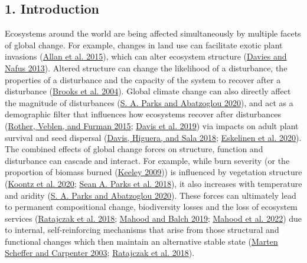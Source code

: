 \documentclass[
  12pt,
]{article}
\begin{document}
\hypertarget{introduction}{%
\subsection{1. Introduction}\label{introduction}}

Ecosystems around the world are being affected simultaneously by
multiple facets of global change. For example, changes in land use can
facilitate exotic plant invasions
(\protect\hyperlink{ref-Allan2015}{Allan et al. 2015}), which can alter
ecosystem structure (\protect\hyperlink{ref-Davies2013}{Davies and Nafus
2013}). Altered structure can change the likelihood of a disturbance,
the properties of a disturbance and the capacity of the system to
recover after a disturbance (\protect\hyperlink{ref-Brooks2004}{Brooks
et al. 2004}). Global climate change can also directly affect the
magnitude of disturbances (\protect\hyperlink{ref-Parks2020}{S. A. Parks
and Abatzoglou 2020}), and act as a demographic filter that influences
how ecosystems recover after disturbances
(\protect\hyperlink{ref-Rother2015}{Rother, Veblen, and Furman 2015};
\protect\hyperlink{ref-Davis2019}{Davis et al. 2019}) via impacts on
adult plant survival and seed dispersal
(\protect\hyperlink{ref-Davis2018}{Davis, Higuera, and Sala 2018};
\protect\hyperlink{ref-Eskelinen2020}{Eskelinen et al. 2020}). The
combined effects of global change forces on structure, function and
disturbance can cascade and interact. For example, while burn severity
(or the proportion of biomass burned
(\protect\hyperlink{ref-Keeley2009}{Keeley 2009})) is influenced by
vegetation structure (\protect\hyperlink{ref-Koontz2020}{Koontz et al.
2020}; \protect\hyperlink{ref-Parks2018}{Sean A. Parks et al. 2018}), it
also increases with temperature and aridity
(\protect\hyperlink{ref-Parks2020}{S. A. Parks and Abatzoglou 2020}).
These forces can ultimately lead to permanent compositional change,
biodiversity losses and the loss of ecosystem services
(\protect\hyperlink{ref-Ratajczak2018}{Ratajczak et al. 2018};
\protect\hyperlink{ref-Mahood2019}{Mahood and Balch 2019};
\protect\hyperlink{ref-Mahood2021}{Mahood et al. 2022}) due to internal,
self-reinforcing mechanisms that arise from those structural and
functional changes which then maintain an alternative stable state
(\protect\hyperlink{ref-Scheffer2003}{Marten Scheffer and Carpenter
2003}; \protect\hyperlink{ref-Ratajczak2018}{Ratajczak et al. 2018}).
\end{document}
